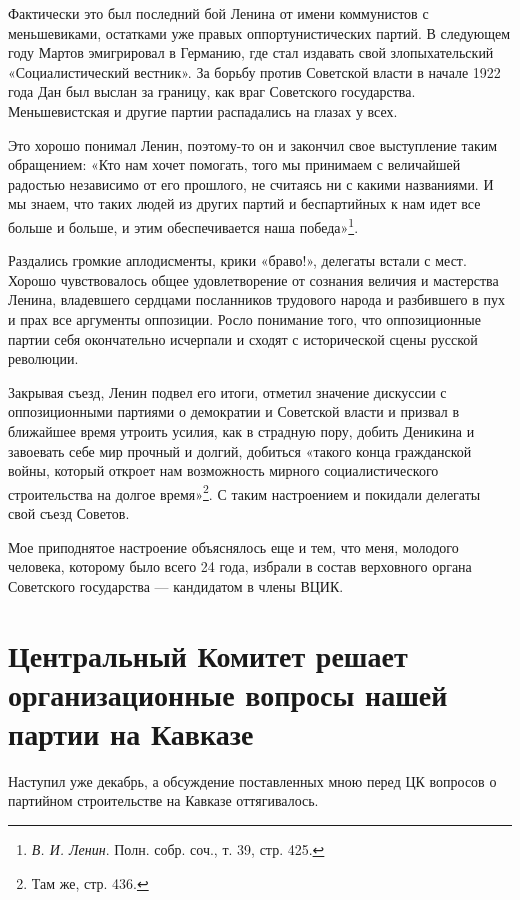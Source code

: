 \documentclass[12pt, a4paper, openany]{book}
\begin{document}
Фактически это был последний бой Ленина от имени коммунистов с меньшевиками, остатками уже правых оппортунистических партий. В следующем году Мартов эмигрировал в Германию, где стал издавать свой злопыхательский «Социалистический вестник». За борьбу против Советской власти в начале 1922 года Дан был выслан за границу, как враг Советского государства. Меньшевистская и другие партии распадались на глазах у всех.

Это хорошо понимал Ленин, поэтому-то он и закончил свое выступление таким обращением: «Кто нам хочет помогать, того мы принимаем с величайшей радостью независимо от его прошлого, не считаясь ни с какими названиями. И мы знаем, что таких людей из других партий и беспартийных к нам идет все больше и больше, и этим обеспечивается наша победа»\footnote{\textit{В. И. Ленин}. Полн. собр. соч., т. 39, стр. 425.}.

Раздались громкие аплодисменты, крики «браво!», делегаты встали с мест. Хорошо чувствовалось общее удовлетворение от сознания величия и мастерства Ленина, владевшего сердцами посланников трудового народа и разбившего в пух и прах все аргументы оппозиции. Росло понимание того, что оппозиционные партии себя окончательно исчерпали и сходят с исторической сцены русской революции.

Закрывая съезд, Ленин подвел его итоги, отметил значение дискуссии с оппозиционными партиями о демократии и Советской власти и призвал в ближайшее время утроить усилия, как в страдную пору, добить Деникина и завоевать себе мир прочный и долгий, добиться «такого конца гражданской войны, который откроет нам возможность мирного социалистического строительства на долгое время»\footnote{Там же, стр. 436.}. С таким настроением и покидали делегаты свой съезд Советов.

Мое приподнятое настроение объяснялось еще и тем, что меня, молодого человека, которому было всего 24 года, избрали в состав верховного органа Советского государства — кандидатом в члены ВЦИК.

\newpage
\section[Центральный Комитет решает организационные вопросы нашей партии на Кавказе]{\center \textbf{Центральный Комитет решает организационные вопросы нашей партии на Кавказе}}


Наступил уже декабрь, а обсуждение поставленных мною перед ЦК вопросов о партийном строительстве на Кавказе оттягивалось.
\end{document}
